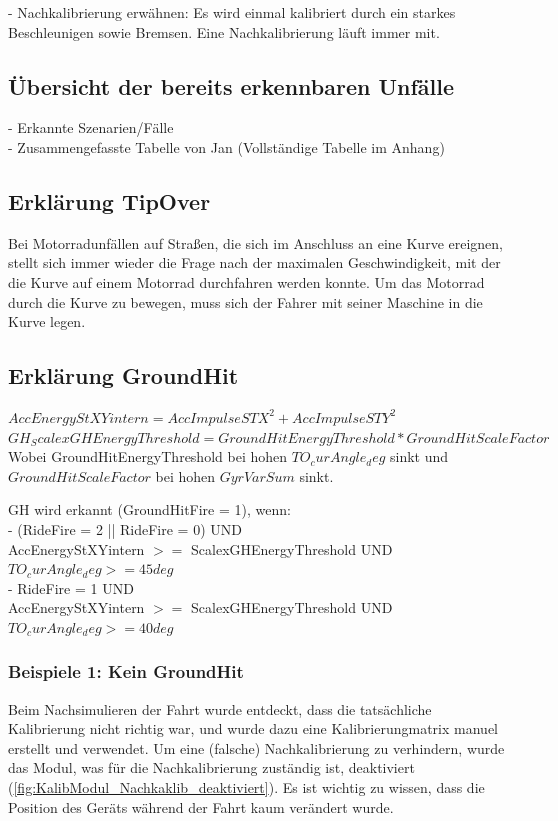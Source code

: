 - Nachkalibrierung erwähnen: Es wird einmal kalibriert durch ein starkes Beschleunigen sowie Bremsen. Eine Nachkalibrierung läuft immer mit.


\subsection{Übersicht der bereits erkennbaren Unfälle}

- Erkannte Szenarien/Fälle\\

- Zusammengefasste Tabelle von Jan (Vollständige Tabelle im Anhang)


\subsection{Erklärung TipOver} %
%
%
%
%
Bei Motorradunfällen auf Straßen, die sich im Anschluss an eine Kurve ereignen, stellt sich immer wieder die Frage nach der maximalen Geschwindigkeit, mit der die Kurve auf einem Motorrad durchfahren werden konnte.
Um das Motorrad durch die Kurve zu bewegen, muss sich der Fahrer mit seiner Maschine in die Kurve legen. 



\subsection{Erklärung GroundHit}
%
%
%
%
$AccEnergyStXYintern = AccImpulseSTX^2+ AccImpulseSTY^2$\\
$GH_ScalexGHEnergyThreshold = GroundHitEnergyThreshold * GroundHitScaleFactor$\\
Wobei GroundHitEnergyThreshold bei hohen $TO_curAngle_deg$ sinkt und $GroundHitScaleFactor$ bei hohen $GyrVarSum$ sinkt.

GH wird erkannt (GroundHitFire = 1), wenn:\\
-	(RideFire = 2 || RideFire = 0) UND \\
AccEnergyStXYintern $>=$ ScalexGHEnergyThreshold UND\\
$TO_curAngle_deg >=45 deg$\\

-	RideFire = 1 UND \\
AccEnergyStXYintern $>=$ ScalexGHEnergyThreshold UND\\
$TO_curAngle_deg >=40 deg$

\subsubsection{Beispiele 1: Kein GroundHit}
Beim Nachsimulieren der Fahrt wurde entdeckt, dass die tatsächliche Kalibrierung nicht richtig war, und wurde dazu eine Kalibrierungmatrix manuel erstellt und verwendet. Um eine (falsche) Nachkalibrierung zu verhindern, wurde das Modul, was für die Nachkalibrierung zuständig ist, deaktiviert (\autoref{fig:KalibModul_Nachkaklib_deaktiviert}). Es ist wichtig zu wissen, dass die Position des Geräts während der Fahrt kaum verändert wurde.


